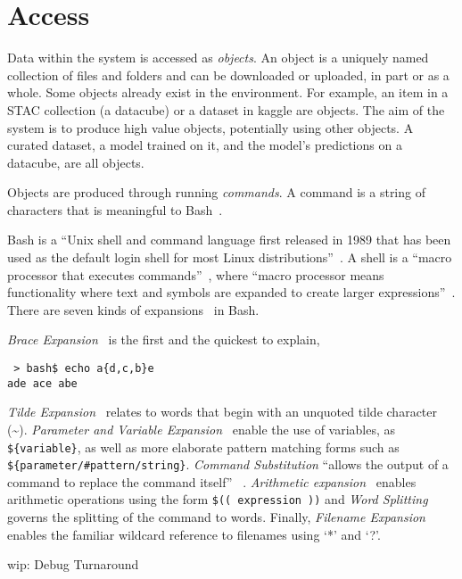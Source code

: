 \section{Access}

Data within the system is accessed as \emph{objects}. An object is a uniquely named collection of files and folders and can be downloaded or uploaded, in part or as a whole. Some objects already exist in the environment. For example, an item in a STAC collection (a datacube) or a dataset in kaggle are objects. The aim of the system is to produce high value objects, potentially using other objects. A curated dataset, a model trained on it, and the model's predictions on a datacube, are all objects.

Objects are produced through running \emph{commands}. A command is a string of characters that is meaningful to Bash~\cite{gnu_bash}. 

Bash is a \enquote{Unix shell and command language first released in 1989 that has been used as the default login shell for most Linux distributions}~\cite{bash}. A shell is a \enquote{macro processor that executes commands}~\cite{bash_manual}, where \enquote{macro processor means functionality where text and symbols are expanded to create larger expressions}~\cite{bash_manual}. There are seven kinds of expansions~\cite{bash_expansions_ref} in Bash.

\emph{Brace Expansion}~\cite{brace_expansion} is the first and the quickest to explain,
%
\begin{verbatim}
 > bash$ echo a{d,c,b}e
ade ace abe
\end{verbatim}
%
\emph{Tilde Expansion}~\cite{tilde_expansion} relates to words that begin with an unquoted tilde character (\textasciitilde). \emph{Parameter and Variable Expansion}~\cite{shell_parameter_expansion} enable the use of variables, as \texttt{\$\{variable\}}, as well as more elaborate pattern matching forms such as \texttt{\$\{parameter/\#pattern/string\}}. \emph{Command Substitution} \enquote{allows the output of a command to replace the command itself} ~\cite{command_substitution}. \emph{Arithmetic expansion}~\cite{arithmetic_expansion} enables arithmetic operations using the form \texttt{\$(( expression ))} and \emph{Word Splitting}~\cite{word_splitting} governs the splitting of the command to words. Finally, \emph{Filename Expansion}~\cite{filename_expansion} enables the familiar wildcard reference to filenames using `*' and `?'.







wip: Debug Turnaround